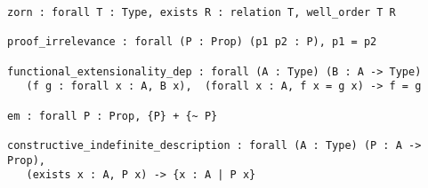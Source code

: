 \documentclass{article}
\begin{document}
\begin{verbatim}
zorn : forall T : Type, exists R : relation T, well_order T R

proof_irrelevance : forall (P : Prop) (p1 p2 : P), p1 = p2

functional_extensionality_dep : forall (A : Type) (B : A -> Type)
   (f g : forall x : A, B x),  (forall x : A, f x = g x) -> f = g
   
em : forall P : Prop, {P} + {~ P}

constructive_indefinite_description : forall (A : Type) (P : A -> Prop),
   (exists x : A, P x) -> {x : A | P x}
\end{verbatim}
\end{document}
